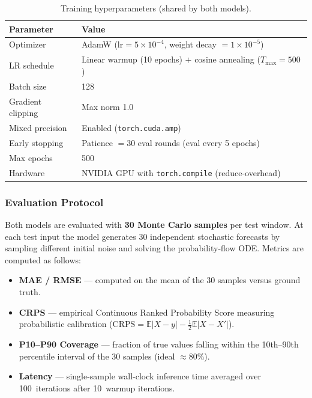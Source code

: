 \documentclass[11pt,a4paper]{article}
\begin{document}
\begin{table}[H]
\centering
\caption{Training hyperparameters (shared by both models).}
\label{tab:training-config}
\begin{tabular}{@{}ll@{}}
\toprule
\textbf{Parameter} & \textbf{Value} \\
\midrule
Optimizer           & AdamW ($\text{lr}=5\times10^{-4}$, weight decay $=1\times10^{-5}$) \\
LR schedule         & Linear warmup (10 epochs) $+$ cosine annealing ($T_{\max}=500$) \\
Batch size          & 128 \\
Gradient clipping   & Max norm 1.0 \\
Mixed precision     & Enabled (\texttt{torch.cuda.amp}) \\
Early stopping      & Patience $=30$ eval rounds (eval every 5 epochs) \\
Max epochs          & 500 \\
Hardware            & NVIDIA GPU with \texttt{torch.compile} (reduce-overhead) \\
\bottomrule
\end{tabular}
\end{table}

\subsubsection{Evaluation Protocol}

Both models are evaluated with \textbf{30 Monte Carlo samples} per test
window.
At each test input the model generates 30 independent stochastic forecasts
by sampling different initial noise and solving the probability-flow ODE.
Metrics are computed as follows:

\begin{itemize}[nosep]
    \item \textbf{MAE / RMSE} --- computed on the mean of the 30 samples
          versus ground truth.
    \item \textbf{CRPS} --- empirical Continuous Ranked Probability Score
          measuring probabilistic calibration
          ($\text{CRPS} = \mathbb{E}|X-y| - \tfrac{1}{2}\mathbb{E}|X-X'|$).
    \item \textbf{P10--P90 Coverage} --- fraction of true values falling
          within the 10th--90th percentile interval of the 30 samples
          (ideal $\approx 80\%$).
    \item \textbf{Latency} --- single-sample wall-clock inference time
          averaged over 100~iterations after 10~warmup iterations.
\end{itemize}
\end{document}
